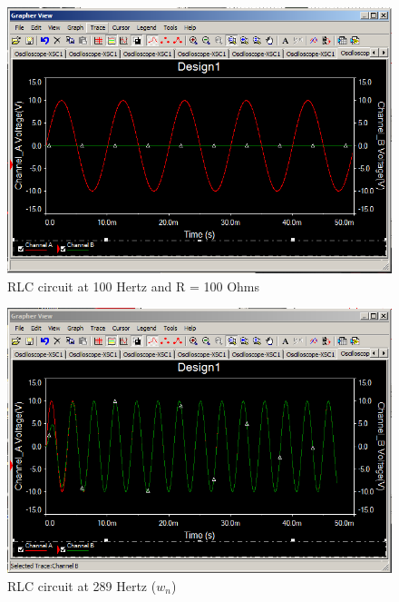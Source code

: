 \documentclass[12pt]{article}
\begin{document}
\begin{figure}[h!] %
   \centering
   \includegraphics[width=5in]{100hz_100r.PNG} 
   \caption{RLC circuit at 100 Hertz and R = 100 Ohms}
   \label{fig:example}
\end{figure}

\newpage

\begin{figure}[h!] %
   \centering
   \includegraphics[width=5in]{289hz.PNG} 
   \caption{RLC circuit at 289 Hertz ($w_{n}$)}
   \label{fig:example}
\end{figure}
\bigskip
\end{document}
